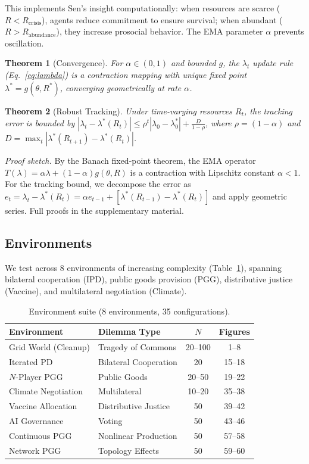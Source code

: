 \documentclass{article}
\newtheorem{theorem}{Theorem}
\begin{document}
\noindent This implements Sen's insight computationally: when resources are scarce ($R < R_{\text{crisis}}$), agents reduce commitment to ensure survival; when abundant ($R > R_{\text{abundance}}$), they increase prosocial behavior. The EMA parameter $\alpha$ prevents oscillation.

\begin{theorem}[Convergence]
\label{thm:convergence}
For $\alpha \in (0,1)$ and bounded $g$, the $\lambda_t$ update rule (Eq.~\ref{eq:lambda}) is a contraction mapping with unique fixed point $\lambda^* = g(\theta, R^*)$, converging geometrically at rate $\alpha$.
\end{theorem}

\begin{theorem}[Robust Tracking]
\label{thm:tracking}
Under time-varying resources $R_t$, the tracking error is bounded by $|\lambda_t - \lambda^*(R_t)| \le \rho^t |\lambda_0 - \lambda^*_0| + \frac{D}{1-\rho}$, where $\rho = (1-\alpha)$ and $D = \max_t |\lambda^*(R_{t+1}) - \lambda^*(R_t)|$.
\end{theorem}

\noindent \textit{Proof sketch.} By the Banach fixed-point theorem, the EMA operator $T(\lambda) = \alpha \lambda + (1-\alpha)g(\theta, R)$ is a contraction with Lipschitz constant $\alpha < 1$. For the tracking bound, we decompose the error as $e_t = \lambda_t - \lambda^*(R_t) = \alpha e_{t-1} + [\lambda^*(R_{t-1}) - \lambda^*(R_t)]$ and apply geometric series. Full proofs in the supplementary material.

\subsection{Environments}

We test across 8 environments of increasing complexity (Table~\ref{tab:envs}), spanning bilateral cooperation (IPD), public goods provision (PGG), distributive justice (Vaccine), and multilateral negotiation (Climate).

\begin{table}[h]
\centering
\caption{Environment suite (8 environments, 35 configurations).}
\label{tab:envs}
\begin{tabular}{llcc}
\toprule
Environment & Dilemma Type & $N$ & Figures \\
\midrule
Grid World (Cleanup) & Tragedy of Commons & 20--100 & 1--8 \\
Iterated PD & Bilateral Cooperation & 20 & 15--18 \\
$N$-Player PGG & Public Goods & 20--50 & 19--22 \\
Climate Negotiation & Multilateral & 10--20 & 35--38 \\
Vaccine Allocation & Distributive Justice & 50 & 39--42 \\
AI Governance & Voting & 50 & 43--46 \\
Continuous PGG & Nonlinear Production & 50 & 57--58 \\
Network PGG & Topology Effects & 50 & 59--60 \\
\bottomrule
\end{tabular}
\end{table}
\end{document}

